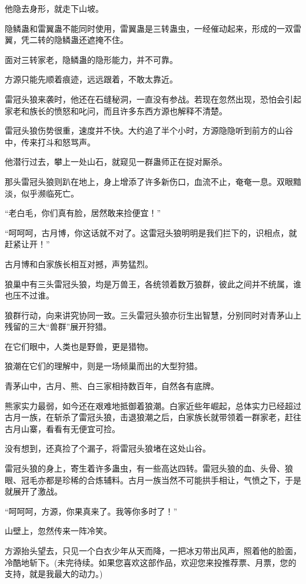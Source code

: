 \begin{this_body}
他隐去身形，就走下山坡。

隐鳞蛊和雷翼蛊不能同时使用，雷翼蛊是三转蛊虫，一经催动起来，形成的一双雷翼，凭二转的隐鳞蛊还遮掩不住。

面对三转家老，隐鳞蛊的隐形能力，并不可靠。

方源只能先顺着痕迹，远远跟着，不敢太靠近。

雷冠头狼来袭时，他还在石缝秘洞，一直没有参战。若现在忽然出现，恐怕会引起家老和族长的愤怒和叱问，而且许多东西方源也解释不清楚。

雷冠头狼伤势很重，速度并不快。大约追了半个小时，方源隐隐听到前方的山谷中，传来打斗和怒骂声。

他潜行过去，攀上一处山石，就窥见一群蛊师正在捉对厮杀。

那头雷冠头狼则趴在地上，身上增添了许多新伤口，血流不止，奄奄一息。双眼黯淡，似乎濒临死亡。

“老白毛，你们真有脸，居然敢来捡便宜！”

“呵呵呵，古月博，你这话就不对了。这雷冠头狼明明是我们拦下的，识相点，就赶紧让开！”

古月博和白家族长相互对撼，声势猛烈。

狼巢中有三头雷冠头狼，均是万兽王，各统领着数万狼群，彼此之间并不统属，谁也压不过谁。

狼群行动，向来讲究协同一致。三头雷冠头狼亦衍生出智慧，分别同时对青茅山上残留的三大“兽群”展开狩猎。

在它们眼中，人类也是野兽，更是猎物。

狼潮在它们的理解中，则是一场倾巢而出的大型狩猎。

青茅山中，古月、熊、白三家相持数百年，自然各有底牌。

熊家实力最弱，如今还在艰难地抵御着狼潮。白家近些年崛起，总体实力已经超过古月一族，在斩杀了雷冠头狼，击退狼潮之后，白家族长就带领着一群家老，赶往古月山寨，看看有无便宜可捡。

没有想到，还真捡了个漏子，将雷冠头狼堵在这处山谷。

雷冠头狼的身上，寄生着许多蛊虫，有一些高达四转。雷冠头狼的血、头骨、狼眼、冠毛亦都是珍稀的合炼辅料。古月一族当然不可能拱手相让，气愤之下，于是就展开了激战。

“呵呵呵，方源，你果真来了。我等你多时了！”

山壁上，忽然传来一阵冷笑。

方源抬头望去，只见一个白衣少年从天而降，一把冰刃带出风声，照着他的脸面，冷酷地斩下。(未完待续。如果您喜欢这部作品，欢迎您来投推荐票、月票，您的支持，就是我最大的动力。)

\end{this_body}

